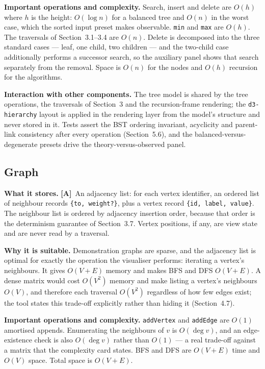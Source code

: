 \documentclass[11pt,a4paper]{article}
\newcommand{\A}{\textcolor{asmc}{\textbf{[A]}}}     %
\newcommand{\ct}[1]{\texttt{#1}}
\begin{document}
\smallskip
\noindent\textbf{Important operations and complexity.} Search, insert and delete are $O(h)$ where
$h$ is the height: $O(\log n)$ for a balanced tree and $O(n)$ in the worst case, which the sorted
input preset makes observable. \ct{min} and \ct{max} are $O(h)$. The traversals of Section~3.1--3.4
are $O(n)$. Delete is decomposed into the three standard cases --- leaf, one child, two children
--- and the two-child case additionally performs a successor search, so the auxiliary panel shows
that search separately from the removal. Space is $O(n)$ for the nodes and $O(h)$ recursion for
the algorithms.

\smallskip
\noindent\textbf{Interaction with other components.} The tree model is shared by the tree
operations, the traversals of Section~3 and the recursion-frame rendering; the \ct{d3-hierarchy}
layout is applied in the rendering layer from the model's structure and never stored in it. Tests
assert the BST ordering invariant, acyclicity and parent-link consistency after every operation
(Section~5.6), and the balanced-versus-degenerate presets drive the theory-versus-observed panel.

\subsection{Graph}

\noindent\textbf{What it stores.} \A\ An adjacency list: for each vertex identifier, an ordered
list of neighbour records \ct{\{to, weight?\}}, plus a vertex record \ct{\{id, label, value\}}. The
neighbour list is ordered by adjacency insertion order, because that order is the determinism
guarantee of Section~3.7. Vertex positions, if any, are view state and are never read by a
traversal.

\smallskip
\noindent\textbf{Why it is suitable.} Demonstration graphs are sparse, and the adjacency list is
optimal for exactly the operation the visualiser performs: iterating a vertex's neighbours. It
gives $O(V+E)$ memory and makes BFS and DFS $O(V+E)$. A dense matrix would cost $O(V^2)$ memory
and make listing a vertex's neighbours $O(V)$, and therefore each traversal $O(V^2)$ regardless of
how few edges exist; the tool states this trade-off explicitly rather than hiding it (Section~4.7).

\smallskip
\noindent\textbf{Important operations and complexity.} \ct{addVertex} and \ct{addEdge} are $O(1)$
amortised appends. Enumerating the neighbours of $v$ is $O(\deg v)$, and an edge-existence check is
also $O(\deg v)$ rather than $O(1)$ --- a real trade-off against a matrix that the complexity card
states. BFS and DFS are $O(V+E)$ time and $O(V)$ space. Total space is $O(V+E)$.
\end{document}

